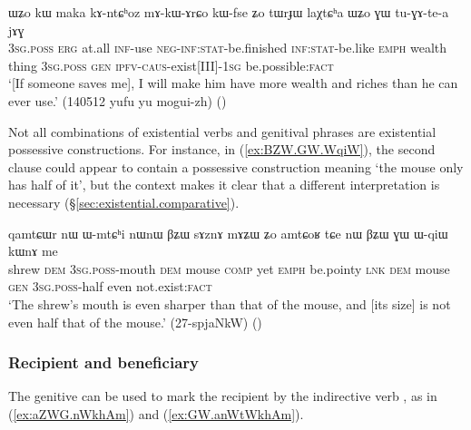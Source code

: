 \begin{exe} 
\ex \label{ex:WZo.GW.tuGAtea} 
\gll ɯʑo kɯ maka kɤ-ntɕʰoz mɤ-kɯ-ɤrɕo kɯ-fse ʑo tɯrɟɯ laχtɕʰa ɯʑo ɣɯ tu-ɣɤ-te-a jɤɣ \\ 
\textsc{3sg}.\textsc{poss} \textsc{erg} at.all \textsc{inf}-use \textsc{neg}-\textsc{inf}:\textsc{stat}-be.finished \textsc{inf}:\textsc{stat}-be.like \textsc{emph} wealth thing \textsc{3sg}.\textsc{poss} \textsc{gen} \textsc{ipfv}-\textsc{caus}-exist[III]-\textsc{1sg} be.possible:\textsc{fact} \\ 
\glt `[If someone saves me], I will make him have more wealth and riches than he can ever use.' (140512 yufu yu mogui-zh) 
()
\end{exe} 

Not all combinations of existential verbs and genitival phrases are existential possessive constructions. For instance, in (\ref{ex:BZW.GW.WqiW}), the second clause could appear to contain a possessive construction meaning `the mouse only has half of it', but the context makes it clear that a different interpretation is necessary (§\ref{sec:existential.comparative}).

\begin{exe}
\ex \label{ex:BZW.GW.WqiW}
\gll qamtɕɯr nɯ ɯ-mtɕʰi nɯnɯ βʑɯ sɤznɤ mɤʑɯ ʑo amtɕoʁ tɕe nɯ βʑɯ ɣɯ ɯ-qiɯ kɯnɤ me \\
shrew \textsc{dem} \textsc{3sg}.\textsc{poss}-mouth \textsc{dem} mouse \textsc{comp} yet \textsc{emph} be.pointy \textsc{lnk} \textsc{dem} mouse \textsc{gen} \textsc{3sg}.\textsc{poss}-half even not.exist:\textsc{fact} \\
\glt `The shrew's mouth is even sharper than that of the mouse, and [its size] is not even half that of the mouse.' (27-spjaNkW)
()
\end{exe}




\subsubsection{Recipient and beneficiary} \label{sec:gen.beneficiary}
 
The genitive can be used to mark the recipient by the indirective verb , as in (\ref{ex:aZWG.nWkhAm}) and (\ref{ex:GW.anWtWkhAm}).   

